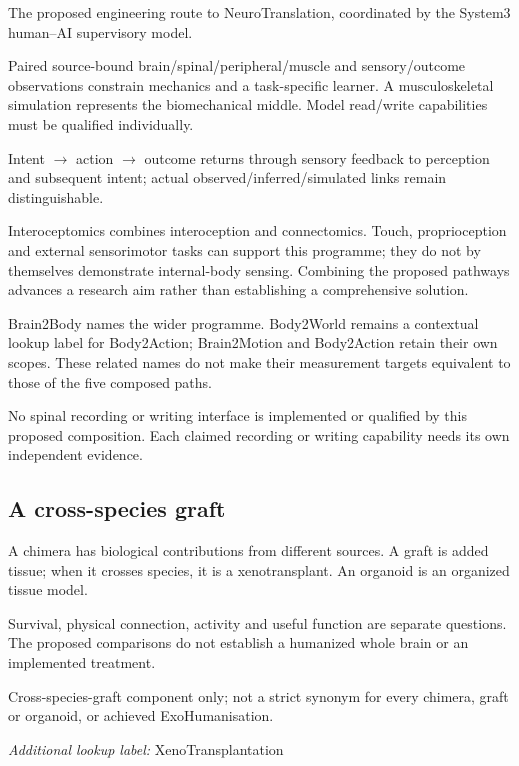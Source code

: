 \noindent The proposed engineering route to NeuroTranslation, coordinated by the System3 human–AI supervisory model.\par
\noindent Paired source-bound brain/spinal/peripheral/muscle and sensory/outcome observations constrain mechanics and a task-specific learner. A musculoskeletal simulation represents the biomechanical middle. Model read/write capabilities must be qualified individually.\par
\noindent Intent \texorpdfstring{\ensuremath{\rightarrow}}{->} action \texorpdfstring{\ensuremath{\rightarrow}}{->} outcome returns through sensory feedback to perception and subsequent intent; actual observed/inferred/simulated links remain distinguishable.\par
\noindent Interoceptomics combines interoception and connectomics. Touch, proprioception and external sensorimotor tasks can support this programme; they do not by themselves demonstrate internal-body sensing. Combining the proposed pathways advances a research aim rather than establishing a comprehensive solution.\par
\noindent Brain2Body names the wider programme. Body2World remains a contextual lookup label for Body2Action; Brain2Motion and Body2Action retain their own scopes. These related names do not make their measurement targets equivalent to those of the five composed paths.\par
\noindent No spinal recording or writing interface is implemented or qualified by this proposed composition. Each claimed recording or writing capability needs its own independent evidence.\par


\subsection*{A cross-species graft}

\noindent A chimera has biological contributions from different sources. A graft is added tissue; when it crosses species, it is a xenotransplant. An organoid is an organized tissue model.\par

\noindent Survival, physical connection, activity and useful function are separate questions. The proposed comparisons do not establish a humanized whole brain or an implemented treatment.\par

\begin{samepage}

\noindent Cross-species-graft component only; not a strict synonym for every chimera, graft or organoid, or achieved ExoHumanisation.\par\nopagebreak[4]

\noindent\textit{Additional lookup label:} XenoTransplantation\par

\end{samepage}

